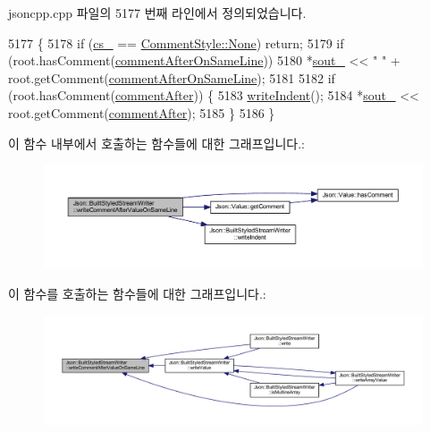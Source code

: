 jsoncpp.\+cpp 파일의 5177 번째 라인에서 정의되었습니다.


\begin{DoxyCode}
5177                                                                                 \{
5178   \textcolor{keywordflow}{if} (\hyperlink{struct_json_1_1_built_styled_stream_writer_a89a9c76c7531143b52785861ba21c1d4}{cs\_} == \hyperlink{struct_json_1_1_comment_style_a51fc08f3518fd81eba12f340d19a3d0cac8b32a8bae63414c8647d4919da8d437}{CommentStyle::None}) \textcolor{keywordflow}{return};
5179   \textcolor{keywordflow}{if} (root.hasComment(\hyperlink{namespace_json_a4fc417c23905b2ae9e2c47d197a45351a008a230a0586de54f30b76afe70fdcfa}{commentAfterOnSameLine}))
5180     *\hyperlink{class_json_1_1_stream_writer_a4f5603d4228a9fa46a42cb44e5234d9b}{sout\_} << \textcolor{stringliteral}{" "} + root.getComment(\hyperlink{namespace_json_a4fc417c23905b2ae9e2c47d197a45351a008a230a0586de54f30b76afe70fdcfa}{commentAfterOnSameLine});
5181 
5182   \textcolor{keywordflow}{if} (root.hasComment(\hyperlink{namespace_json_a4fc417c23905b2ae9e2c47d197a45351ac5784ca53b12250888ddb642b06aebef}{commentAfter})) \{
5183     \hyperlink{struct_json_1_1_built_styled_stream_writer_a2b38a3714d415c4bd3b4812897130f3d}{writeIndent}();
5184     *\hyperlink{class_json_1_1_stream_writer_a4f5603d4228a9fa46a42cb44e5234d9b}{sout\_} << root.getComment(\hyperlink{namespace_json_a4fc417c23905b2ae9e2c47d197a45351ac5784ca53b12250888ddb642b06aebef}{commentAfter});
5185   \}
5186 \}
\end{DoxyCode}
이 함수 내부에서 호출하는 함수들에 대한 그래프입니다.\+:\nopagebreak
\begin{figure}[H]
\begin{center}
\leavevmode
\includegraphics[width=350pt]{struct_json_1_1_built_styled_stream_writer_a89625b134fce0255263ca40e6125742b_cgraph}
\end{center}
\end{figure}
이 함수를 호출하는 함수들에 대한 그래프입니다.\+:\nopagebreak
\begin{figure}[H]
\begin{center}
\leavevmode
\includegraphics[width=350pt]{struct_json_1_1_built_styled_stream_writer_a89625b134fce0255263ca40e6125742b_icgraph}
\end{center}
\end{figure}
